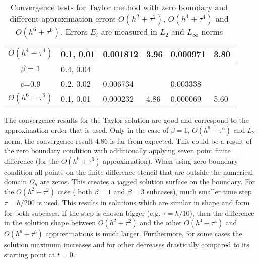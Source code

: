 \documentclass[%
 aip,
cp,  %
 amsmath,amssymb,%
 reprint,%
]{revtex4-2}
\begin{document}
\begin{table}[ht]
\begin{tabular}{||c|l|ll|ll||}
       $O(h^4+ \tau^4)$ &0.1, 0.01   &0.001812 & 3.96  & 0.000971  & 3.80  \\
    \hline
  $\beta=1$     &0.4, 0.04   &            &          &                  &      \\
      c=0.9                    &0.2, 0.02   &0.006734 &           & 0.003338      &       \\
     $O(h^6+ \tau^6)$ &0.1, 0.01 & 0.000232 &4.86 & 0.000069  & 5.60        \\
	   \hline
			\hline 
		\end{tabular}
		\caption{Convergence tests for Taylor method with zero boundary and different approximation errors $O(h^{2} + \tau^2 )$, $O(h^{4} + \tau^4 )$ and $O(h^{6} + \tau^6 )$. Errors $E_i$ are measured in $L_2$ and $L_\infty$ norms}
\label{table:A}
\end{table}

The convergence results for the Taylor solution are good and correspond to the approximation order that is used. Only in the case of $\beta = 1$, $O(h^6 + \tau^6)$ and $L_2$ norm, the convergence result $4.86$ is far from expected. This could be a result of the zero boundary condition with additionally applying seven point finite difference (for the $O(h^6 + \tau^6)$ approximation). When using zero boundary condition all points on the finite difference stencil that are outside the numerical domain $\Omega_h$ are zeros. This creates a jagged solution surface on the boundary. For the $O(h^2 + \tau^2)$ case ( both $\beta = 1$ and $\beta = 3$ subcases), much smaller time step  $\tau = h/200$ is used. This results in solutions which are similar in shape and form for both subcases. If the step is chosen bigger (e.g. $\tau = h/10$), then the difference in the solution shape between $O(h^2 + \tau^2)$ and the other $O(h^4 + \tau^4)$ and $O(h^6 + \tau^6)$ approximations is much larger. Furthermore, for some cases the solution maximum increases and for other decreases drastically compared to its starting point at $t=0$.
\end{document}
